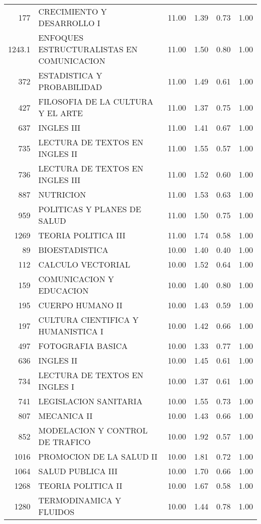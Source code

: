 \documentclass[12pt]{article}
\begin{document}
\begin{table}[ht]
\begin{tabular}{rlrrrr}
  177 & CRECIMIENTO Y DESARROLLO I & 11.00 & 1.39 & 0.73 & 1.00 \\ 
  1243.1 & ENFOQUES ESTRUCTURALISTAS EN COMUNICACION & 11.00 & 1.50 & 0.80 & 1.00 \\ 
  372 & ESTADISTICA Y PROBABILIDAD & 11.00 & 1.49 & 0.61 & 1.00 \\ 
  427 & FILOSOFIA DE LA CULTURA Y EL ARTE & 11.00 & 1.37 & 0.75 & 1.00 \\ 
  637 & INGLES III & 11.00 & 1.41 & 0.67 & 1.00 \\ 
  735 & LECTURA DE TEXTOS EN INGLES II & 11.00 & 1.55 & 0.57 & 1.00 \\ 
  736 & LECTURA DE TEXTOS EN INGLES III & 11.00 & 1.52 & 0.60 & 1.00 \\ 
  887 & NUTRICION & 11.00 & 1.53 & 0.63 & 1.00 \\ 
  959 & POLITICAS Y PLANES DE SALUD & 11.00 & 1.50 & 0.75 & 1.00 \\ 
  1269 & TEORIA POLITICA III & 11.00 & 1.74 & 0.58 & 1.00 \\ 
  89 & BIOESTADISTICA & 10.00 & 1.40 & 0.40 & 1.00 \\ 
  112 & CALCULO VECTORIAL & 10.00 & 1.52 & 0.64 & 1.00 \\ 
  159 & COMUNICACION Y EDUCACION & 10.00 & 1.40 & 0.80 & 1.00 \\ 
  195 & CUERPO HUMANO II & 10.00 & 1.43 & 0.59 & 1.00 \\ 
  197 & CULTURA CIENTIFICA Y HUMANISTICA I & 10.00 & 1.42 & 0.66 & 1.00 \\ 
  497 & FOTOGRAFIA BASICA & 10.00 & 1.33 & 0.77 & 1.00 \\ 
  636 & INGLES II & 10.00 & 1.45 & 0.61 & 1.00 \\ 
  734 & LECTURA DE TEXTOS EN INGLES I & 10.00 & 1.37 & 0.61 & 1.00 \\ 
  741 & LEGISLACION SANITARIA & 10.00 & 1.55 & 0.73 & 1.00 \\ 
  807 & MECANICA II & 10.00 & 1.43 & 0.66 & 1.00 \\ 
  852 & MODELACION Y CONTROL DE TRAFICO & 10.00 & 1.92 & 0.57 & 1.00 \\ 
  1016 & PROMOCION DE LA SALUD II & 10.00 & 1.81 & 0.72 & 1.00 \\ 
  1064 & SALUD PUBLICA III & 10.00 & 1.70 & 0.66 & 1.00 \\ 
  1268 & TEORIA POLITICA II & 10.00 & 1.67 & 0.58 & 1.00 \\ 
  1280 & TERMODINAMICA Y FLUIDOS & 10.00 & 1.44 & 0.78 & 1.00 \\ 

\end{tabular}
\end{table}
\end{document}
